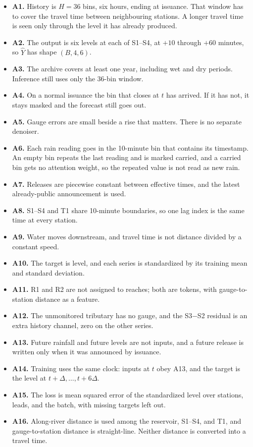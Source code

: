 \documentclass[11pt,a4paper]{article}
\begin{document}
\begin{itemize}
\item \textbf{A1.} History is \(H=36\) bins, six hours, ending at issuance. That window has to cover the travel time between neighbouring stations. A longer travel time is seen only through the level it has already produced.
\item \textbf{A2.} The output is six levels at each of S1--S4, at $+10$ through $+60$ minutes, so $\hat Y$ has shape $(B,4,6)$.
\item \textbf{A3.} The archive covers at least one year, including wet and dry periods. Inference still uses only the 36-bin window.
\item \textbf{A4.} On a normal issuance the bin that closes at $t$ has arrived. If it has not, it stays masked and the forecast still goes out.
\item \textbf{A5.} Gauge errors are small beside a rise that matters. There is no separate denoiser.
\item \textbf{A6.} Each rain reading goes in the 10-minute bin that contains its timestamp. An empty bin repeats the last reading and is marked carried, and a carried bin gets no attention weight, so the repeated value is not read as new rain.
\item \textbf{A7.} Releases are piecewise constant between effective times, and the latest already-public announcement is used.
\item \textbf{A8.} S1--S4 and T1 share 10-minute boundaries, so one lag index is the same time at every station.
\item \textbf{A9.} Water moves downstream, and travel time is not distance divided by a constant speed.
\item \textbf{A10.} The target is level, and each series is standardized by its training mean and standard deviation.
\item \textbf{A11.} R1 and R2 are not assigned to reaches; both are tokens, with gauge-to-station distance as a feature.
\item \textbf{A12.} The unmonitored tributary has no gauge, and the S3$-$S2 residual is an extra history channel, zero on the other series.
\item \textbf{A13.} Future rainfall and future levels are not inputs, and a future release is written only when it was announced by issuance.
\item \textbf{A14.} Training uses the same clock: inputs at $t$ obey A13, and the target is the level at $t+\Delta,\ldots,t+6\Delta$.
\item \textbf{A15.} The loss is mean squared error of the standardized level over stations, leads, and the batch, with missing targets left out.
\item \textbf{A16.} Along-river distance is used among the reservoir, S1--S4, and T1, and gauge-to-station distance is straight-line. Neither distance is converted into a travel time.
\end{itemize}
\end{document}

